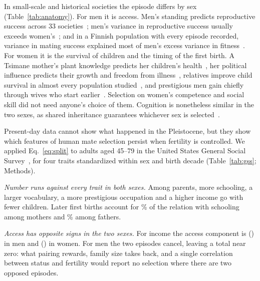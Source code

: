 In small-scale and historical societies the episode differs by sex (Table~\ref{tab:anatomy}). For men it is access. Men's
standing predicts reproductive success across 33 societies~\cite{vonrueden2016}; men's variance in reproductive success
usually exceeds women's~\cite{brown2009,betzig2012}; and in a Finnish population with every episode recorded, variance in mating
success explained most of men's excess variance in fitness~\cite{courtiol2012}. For women it is the survival of children and
the timing of the first birth. A Tsimane mother's plant knowledge predicts her children's health~\cite{mcdade2007}, her
political influence predicts their growth and freedom from illness~\cite{alami2020}, relatives improve child survival in
almost every population studied~\cite{sear2008}, and prestigious men gain chiefly through wives who start
earlier~\cite{vonrueden2011}. Selection on women's competence and social skill did not need anyone's choice of them. Cognition
is nonetheless similar in the two sexes, as shared inheritance guarantees whichever sex is selected~\cite{lande1980}.

\label{sec:restoday}Present-day data cannot show what happened in the Pleistocene, but they show which features of human
mate selection persist when fertility is controlled. We applied Eq.~\eqref{eq:split} to \GssN{} adults aged 45--79 in the
United States General Social Survey~\cite{gss2024}, for four traits standardized within sex and birth decade
(Table~\ref{tab:gss}; Methods).

\emph{Number runs against every trait in both sexes.} Among parents, more schooling, a larger vocabulary, a more
prestigious occupation and a higher income go with fewer children. Later first births account for \GssTimShareW\% of the
relation with schooling among mothers and \GssTimShareM\% among fathers.

\emph{Access has opposite signs in the two sexes.} For income the access component is \GssIncMAcc{} (\GssIncMAccCI) in men and
\GssIncWAcc{} (\GssIncWAccCI) in women. For men the two episodes cancel, leaving a total near zero: what pairing rewards,
family size takes back, and a single correlation between status and fertility would report no selection where there are
two opposed episodes.

